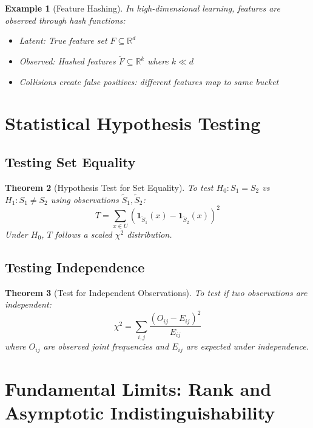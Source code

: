 \documentclass[11pt,final,hidelinks]{article}
\newtheorem{theorem}{Theorem}[section]
\newtheorem{example}[theorem]{Example}
\newcommand{\obs}[1]{\widetilde{#1}}
\newcommand{\Indicator}[1]{\mathbf{1}_{#1}}
\begin{document}
\begin{example}[Feature Hashing]
In high-dimensional learning, features are observed through hash functions:
\begin{itemize}
\item Latent: True feature set $F \subseteq \mathbb{R}^d$
\item Observed: Hashed features $\obs{F} \subseteq \mathbb{R}^k$ where $k \ll d$
\item Collisions create false positives: different features map to same bucket
\end{itemize}
\end{example}

\section{Statistical Hypothesis Testing}

\subsection{Testing Set Equality}

\begin{theorem}[Hypothesis Test for Set Equality]
To test $H_0: S_1 = S_2$ vs $H_1: S_1 \neq S_2$ using observations $\obs{S}_1, \obs{S}_2$:
\begin{equation}
T = \sum_{x \in U} (\Indicator{\obs{S}_1}(x) - \Indicator{\obs{S}_2}(x))^2
\end{equation}
Under $H_0$, $T$ follows a scaled $\chi^2$ distribution.
\end{theorem}

\subsection{Testing Independence}

\begin{theorem}[Test for Independent Observations]
To test if two observations are independent:
\begin{equation}
\chi^2 = \sum_{i,j} \frac{(O_{ij} - E_{ij})^2}{E_{ij}}
\end{equation}
where $O_{ij}$ are observed joint frequencies and $E_{ij}$ are expected under independence.
\end{theorem}

\section{Fundamental Limits: Rank and Asymptotic Indistinguishability}
\end{document}
